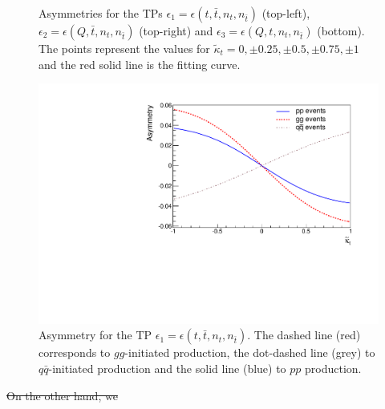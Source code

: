 \documentclass[aps,preprint,tightenlines,floatfix,superscriptaddress,nofootinbib,showpacs]{revtex4-1}
\def\tbar{\bar{t}}
\def\qbar{\bar{q}}
\def\kpt{\tilde{\kappa}_t}
\providecommand{\DIFdel}[1]{{\protect\color{red}\sout{#1}}}                      %
\providecommand{\DIFaddbegin}{} %
\providecommand{\DIFdelbegin}{} %
\providecommand{\DIFdelend}{} %
\begin{document}
\begin{center}
\begin{figure}[H]
\caption{Asymmetries for the TPs
  $\epsilon_1=\epsilon(t,\tbar,n_t,n_{\tbar})$ (top-left),
  $\epsilon_2=\epsilon(Q,\tbar,n_t,n_{\tbar})$ (top-right) and
  $\epsilon_3=\epsilon(Q,t,n_t,n_{\tbar})$ (bottom). The points
  represent the values for $\kpt=0,\pm 0.25, \pm 0.5, \pm 0.75,\pm 1$
  and the red solid line is the fitting curve.}
\label{fig3}
\end{figure}
\end{center}
%
\begin{center}
\vspace*{-4mm}
\begin{figure}[H]
\centering
\includegraphics[scale=0.45]{ATP1juntos_nuevo.pdf}
\caption{Asymmetry for the TP
  $\epsilon_1=\epsilon(t,\tbar,n_t,n_{\tbar})$. The dashed line (red)
  corresponds to $gg$-initiated production, the dot-dashed line (grey)
  to $q\qbar$-initiated production and the solid line (blue) to $pp$
  production.}
\label{fig4}
\end{figure}
\end{center}
\vspace*{-6mm}
\DIFdelbegin %
\DIFdel{On the other hand, we }\DIFdelend \DIFaddbegin 
\end{document}
